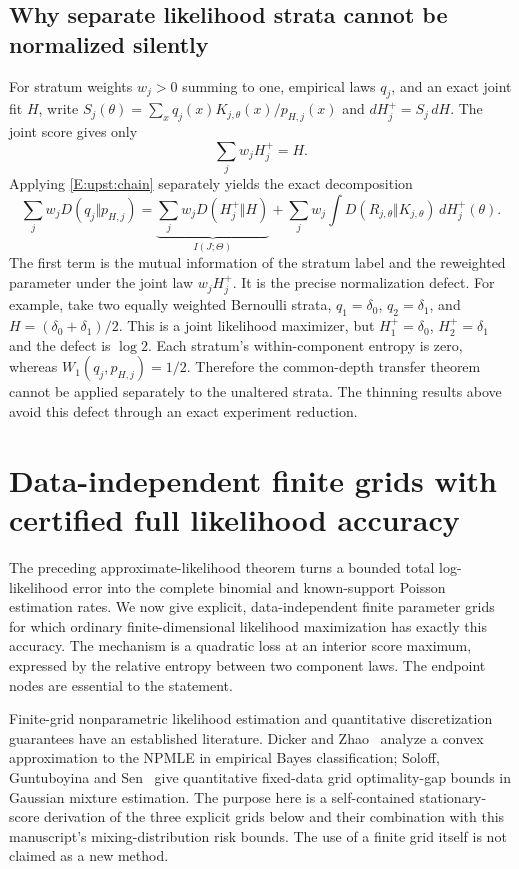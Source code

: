 \documentclass[11pt,a4paper]{article}
\theoremstyle{definition}
\theoremstyle{remark}
\numberwithin{equation}{section}
\begin{document}
\subsection{Why separate likelihood strata cannot be normalized silently}

For stratum weights $w_j>0$ summing to one, empirical laws $q_j$,
and an exact joint fit $H$, write
$S_j(\theta)=\sum_xq_j(x)K_{j,\theta}(x)/p_{H,j}(x)$ and
$dH_j^+=S_j\,dH$. The joint score gives only
\[
             \sum_jw_jH_j^+=H.
\]
Applying \eqref{E:upst:chain} separately yields the exact decomposition
\[
 \sum_jw_jD(q_j\Vert p_{H,j})
 =\underbrace{\sum_jw_jD(H_j^+\Vert H)}_{I(J;\Theta)}
 +\sum_jw_j\int D(R_{j,\theta}\Vert K_{j,\theta})\,dH_j^+(\theta).
\]
The first term is the mutual information of the stratum label and
the reweighted parameter under the joint law $w_jH_j^+$. It is the
precise normalization defect. For example, take two equally weighted
Bernoulli strata, $q_1=\delta_0$, $q_2=\delta_1$, and
$H=(\delta_0+\delta_1)/2$. This is a joint likelihood maximizer,
but $H_1^+=\delta_0$, $H_2^+=\delta_1$ and the defect is $\log2$.
Each stratum's within-component entropy is zero, whereas
$W_1(q_j,p_{H,j})=1/2$. Therefore the common-depth transfer theorem
cannot be applied separately to the unaltered strata. The thinning
results above avoid this defect through an exact experiment reduction.

\section{Data-independent finite grids with certified full likelihood accuracy}
\label{fg:section}

The preceding approximate-likelihood theorem turns a bounded total
log-likelihood error into the complete binomial and known-support Poisson
estimation rates. We now give explicit, data-independent finite parameter
grids for which ordinary finite-dimensional likelihood maximization has
exactly this accuracy. The mechanism is a quadratic loss at an interior
score maximum, expressed by the relative entropy between two component
laws. The endpoint nodes are essential to the statement.

Finite-grid nonparametric likelihood estimation and quantitative
discretization guarantees have an established literature. Dicker and
Zhao~\cite{FG_DickerZhao2016} analyze a convex approximation to the NPMLE
in empirical Bayes classification; Soloff, Guntuboyina and
Sen~\cite[Section~2.3]{FG_SoloffGuntuboyinaSen2025} give quantitative
fixed-data grid optimality-gap bounds in Gaussian mixture estimation.
The purpose here is a self-contained stationary-score derivation of the
three explicit grids below and their combination with this manuscript's
mixing-distribution risk bounds. The use of a finite grid itself is not
claimed as a new method.
\end{document}
